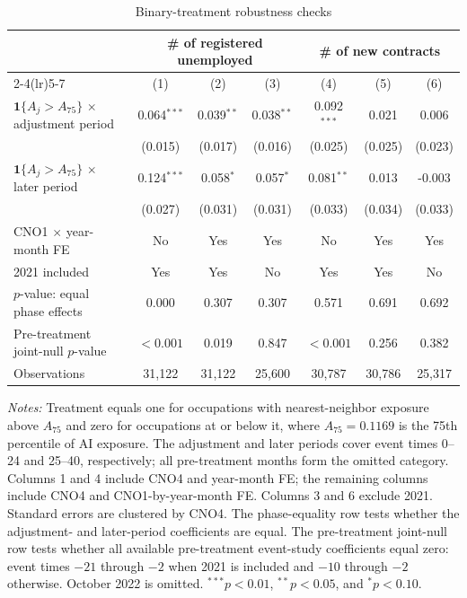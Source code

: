 \begin{table}[!htbp]
\centering
\caption{Binary-treatment robustness checks}
\label{tab:v1_binary_treatment}
\begin{threeparttable}
\scriptsize
\setlength{\tabcolsep}{3.5pt}
\begin{tabular}{lcccccc}
\toprule
& \multicolumn{3}{c}{\# of registered unemployed} & \multicolumn{3}{c}{\# of new contracts} \\
\cmidrule(lr){2-4}\cmidrule(lr){5-7}
& (1) & (2) & (3) & (4) & (5) & (6) \\
\midrule
$\mathbf{1}\{A_j>A_{75}\}$ $\times$ adjustment period & 0.064$^{***}$ & 0.039$^{**}$ & 0.038$^{**}$ & 0.092$^{***}$ & 0.021 & 0.006 \\
 & (0.015) & (0.017) & (0.016) & (0.025) & (0.025) & (0.023) \\
$\mathbf{1}\{A_j>A_{75}\}$ $\times$ later period & 0.124$^{***}$ & 0.058$^{*}$ & 0.057$^{*}$ & 0.081$^{**}$ & 0.013 & -0.003 \\
 & (0.027) & (0.031) & (0.031) & (0.033) & (0.034) & (0.033) \\
\midrule
CNO1 $\times$ year-month FE & No & Yes & Yes & No & Yes & Yes \\
2021 included & Yes & Yes & No & Yes & Yes & No \\
$p$-value: equal phase effects & 0.000 & 0.307 & 0.307 & 0.571 & 0.691 & 0.692 \\
Pre-treatment joint-null $p$-value & $<0.001$ & 0.019 & 0.847 & $<0.001$ & 0.256 & 0.382 \\
Observations & 31,122 & 31,122 & 25,600 & 30,787 & 30,786 & 25,317 \\
\bottomrule
\end{tabular}
\begin{tablenotes}[flushleft]
\footnotesize
\item \emph{Notes:} Treatment equals one for occupations with nearest-neighbor exposure above $A_{75}$ and zero for occupations at or below it, where $A_{75}=0.1169$ is the 75th percentile of AI exposure. The adjustment and later periods cover event times 0--24 and 25--40, respectively; all pre-treatment months form the omitted category. Columns 1 and 4 include CNO4 and year-month FE; the remaining columns include CNO4 and CNO1-by-year-month FE. Columns 3 and 6 exclude 2021. Standard errors are clustered by CNO4. The phase-equality row tests whether the adjustment- and later-period coefficients are equal. The pre-treatment joint-null row tests whether all available pre-treatment event-study coefficients equal zero: event times $-21$ through $-2$ when 2021 is included and $-10$ through $-2$ otherwise. October 2022 is omitted. $^{***}p<0.01$, $^{**}p<0.05$, and $^{*}p<0.10$.
\end{tablenotes}
\end{threeparttable}
\end{table}
